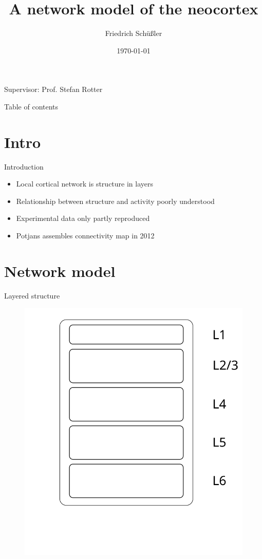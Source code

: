 \documentclass[xcolor=x11names,compress]{beamer}
\renewcommand{\(}{\begin{columns}}
\renewcommand{\)}{\end{columns}}
\newcommand{\<}[1]{\begin{column}{#1}}
\renewcommand{\>}{\end{column}}
\begin{document}
\begin{frame}{}
\title[Neocortex]{A network model of the neocortex}
\author{
Friedrich Schüßler}
\date{\today}
\titlepage

\centering 
Supervisor: Prof. Stefan Rotter
\end{frame}

\begin{frame}{Table of contents}
    \tableofcontents
\end{frame}



\section{Intro}
\begin{frame}[t]{Introduction}
\begin{itemize}
    \item Local cortical network is structure in layers
    \item Relationship between structure and activity poorly understood
    \item Experimental data only partly reproduced
    \item Potjans assembles connectivity map in 2012
\end{itemize}
\end{frame}


\section{Network model}
\begin{frame}[t]{Layered structure}
\begin{figure}[htpb]
    \centering
    \includegraphics[width=0.5\linewidth]{../figures/microcircuit_model_pre}
\label{fig:model_0}
\end{figure}
\end{frame}
\end{document}
